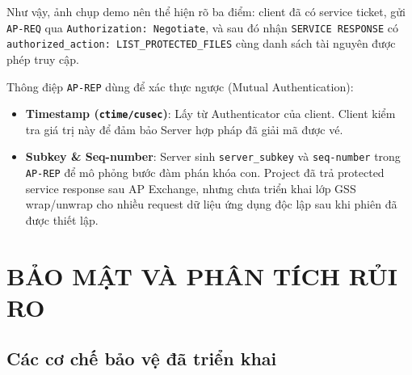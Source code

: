\documentclass[12pt]{article}
\begin{document}
Như vậy, ảnh chụp demo nên thể hiện rõ ba điểm: client đã có service ticket, gửi \texttt{AP-REQ} qua \texttt{Authorization: Negotiate}, và sau đó nhận \texttt{SERVICE RESPONSE} có \texttt{authorized\_action: LIST\_PROTECTED\_FILES} cùng danh sách tài nguyên được phép truy cập.

Thông điệp \texttt{AP-REP} dùng để xác thực ngược (Mutual Authentication):
\begin{itemize}
    \item \textbf{Timestamp (\texttt{ctime/cusec})}: Lấy từ Authenticator của client. Client kiểm tra giá trị này để đảm bảo Server hợp pháp đã giải mã được vé.
    \item \textbf{Subkey \& Seq-number}: Server sinh \texttt{server\_subkey} và \texttt{seq-number} trong \texttt{AP-REP} để mô phỏng bước đàm phán khóa con. Project đã trả protected service response sau AP Exchange, nhưng chưa triển khai lớp GSS wrap/unwrap cho nhiều request dữ liệu ứng dụng độc lập sau khi phiên đã được thiết lập.
\end{itemize}

\section{BẢO MẬT VÀ PHÂN TÍCH RỦI RO}

\subsection{Các cơ chế bảo vệ đã triển khai}
\end{document}
